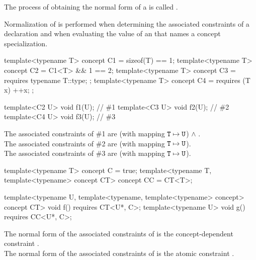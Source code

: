 \pnum
The process of obtaining the normal form of a
is called
.
\begin{note}
Normalization of 
is performed
when determining the associated constraints
of a declaration
and
when evaluating the value of an 
that names a concept specialization.
\end{note}

\pnum
\begin{example}
\begin{codeblock}
template<typename T> concept C1 = sizeof(T) == 1;
template<typename T> concept C2 = C1<T> && 1 == 2;
template<typename T> concept C3 = requires { typename T::type; };
template<typename T> concept C4 = requires (T x) { ++x; };

template<C2 U> void f1(U);      // \#1
template<C3 U> void f2(U);      // \#2
template<C4 U> void f3(U);      // \#3
\end{codeblock}
The associated constraints of \#1 are
 (with mapping $\texttt{\protect T} \mapsto \texttt{\protect U}$) $\land$ .\\
The associated constraints of \#2 are
 (with mapping $\texttt{\protect T} \mapsto \texttt{\protect U}$).\\
The associated constraints of \#3 are
 (with mapping $\texttt{\protect T} \mapsto \texttt{\protect U}$).
\end{example}

\begin{example}
\begin{codeblock}
template<typename T>
concept C = true;
template<typename T, template<typename> concept CT>
concept CC = CT<T>;

template<typename U,
         template<typename, template<typename> concept> concept CT>
  void f() requires CT<U*, C>;
template<typename U>
  void g() requires CC<U*, C>;
\end{codeblock}
The normal form of the associated constraints of  is
the concept-dependent constraint .\\
The normal form of the associated constraints of  is
the atomic constraint .
\end{example}

